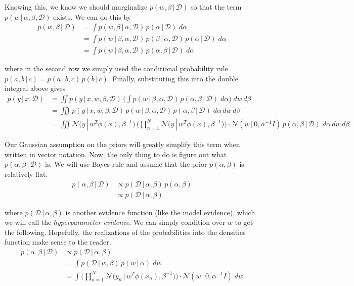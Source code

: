   Knowing this, we know we should marginalize $p(w, \beta\,|\,\mathcal{D})$ so that the term $p(w\,|\, \alpha, \beta, \mathcal{D})$ exists. We can do this by
  \begin{align*}
    p(w, \beta\,|\,\mathcal{D}) & = \int p(w, \beta\,|\,\alpha, \mathcal{D}) \, p(\alpha\,|\,\mathcal{D})\; d\alpha \\
    & = \int p(w\,|\,\beta, \alpha, \mathcal{D}) \, p(\beta \,|\, \alpha, \mathcal{D}) \, p(\alpha\,|\,\mathcal{D}) \; d\alpha \\
    & = \int p(w\,|\, \beta, \alpha, \mathcal{D}) \, p(\alpha, \beta\,|\,\mathcal{D}) \; d\alpha
  \end{align*}

  where in the second row we simply used the conditional probability rule $p(a, b\,|\,c) = p(a\,|\,b, c)\, p(b\,|\,c)$. Finally, substituting this into the double integral above gives
  \begin{align*}
    p(y\,|\,x, \mathcal{D}) & = \iint p(y\,|\,x, w, \beta, \mathcal{D}) \, \bigg( \int p(w\,|\, \beta, \alpha, \mathcal{D}) \, p(\alpha, \beta\,|\,\mathcal{D}) \; d\alpha\bigg) \; dw\, d\beta \\
    & = \iiint p(y\,|\,x, w, \beta, \mathcal{D}) \, p(w\,|\, \beta, \alpha, \mathcal{D}) \, p(\alpha, \beta\,|\,\mathcal{D}) \; d\alpha \,dw\, d\beta \\
    & = \iiint \mathcal{N}\big(y\,|\, w^T \phi(x), \beta^{-1}\big)\,\bigg( \prod_{n=1}^N \mathcal{N}\big( y\,|\, w^T \phi(x), \beta^{-1} \big) \bigg) \cdot \mathcal{N}(w\,|\,0, \alpha^{-1} I)\, p(\alpha, \beta\,|\,\mathcal{D}) \; d\alpha \, dw \, d\beta
  \end{align*}



  Our Gaussian assumption on the priors will greatly simplify this term when written in vector notation. Now, the only thing to do is figure out what $p(\alpha, \beta\,|\,\mathcal{D})$ is. We will use Bayes rule and assume that the prior $p(\alpha, \beta)$ is relatively flat.
  \begin{align*}
    p(\alpha, \beta \,|\,\mathcal{D}) & \propto p( \mathcal{D}\,|\,\alpha, \beta) \, p(\alpha, \beta) \\
    & \propto p(\mathcal{D}\,|\,\alpha, \beta)
  \end{align*}

  where $p(\mathcal{D}\,|\,\alpha, \beta)$ is another evidence function (like the model evidence), which we will call the \textit{hyperparameter evidence}. We can simply condition over $w$ to get the following. Hopefully, the realizations of the probabilities into the densities function make sense to the reader.
  \begin{align*}
    p(\alpha, \beta \,|\, \mathcal{D}) & \propto p(\mathcal{D}\,|\,\alpha, \beta) \\
    & = \int p(\mathcal{D}\,|\,w, \beta) \, p(w \,|\,\alpha)\; dw \\
    & = \int \bigg(\prod_{n=1}^N \mathcal{N} \big(y_n \,|\, w^T \phi(x_n), \beta^{-1} \big)\bigg) \cdot \mathcal{N}(w\,|\, 0, \alpha^{-1} I)\; dw
  \end{align*}

